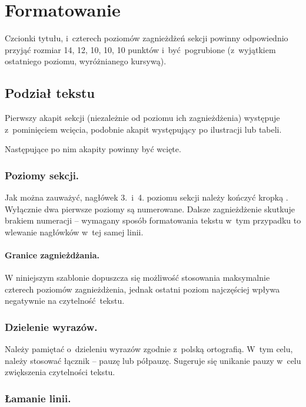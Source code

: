 \section{Formatowanie}
\label{sec:formatting}

Czcionki tytułu, i~czterech poziomów zagnieżdżeń sekcji powinny odpowiednio przyjąć rozmiar 14, 12, 10, 10, 10 punktów i~być pogrubione (z~wyjątkiem ostatniego poziomu, wyróżnianego kursywą).

\subsection{Podział tekstu}
\label{subsec:textDivision}

Pierwszy akapit sekcji (niezależnie od poziomu ich zagnieżdżenia) występuje z~pominięciem wcięcia, podobnie akapit występujący po ilustracji lub tabeli.

Następujące po nim akapity powinny być wcięte.

\subsubsection{Poziomy sekcji.}
\label{subsubsec:levels}

Jak można zauważyć, nagłówek 3.~i~4. poziomu sekcji należy kończyć kropką \cite{ref:lncs}. Wyłącznie dwa pierwsze poziomy są numerowane. Dalsze zagnieżdżenie skutkuje brakiem numeracji -- wymagany sposób formatowania tekstu w~tym przypadku to wlewanie nagłówków w~tej samej linii.

\paragraph{Granice zagnieżdżania.}
\label{par:nestingLimits}

W niniejszym szablonie dopuszcza się możliwość stosowania maksymalnie czterech poziomów zagnieżdżenia, jednak ostatni poziom najczęściej wpływa negatywnie na czytelność tekstu.

\subsubsection{Dzielenie wyrazów.}
\label{subsubsec:wordbreak}

Należy pamiętać o~dzieleniu wyrazów zgodnie z~polską ortografią. W~tym celu, należy stosować łącznik -- pauzę lub półpauzę. Sugeruje się unikanie pauzy w~celu zwiększenia czytelności tekstu.

\subsubsection{Łamanie linii.}
\label{subsubsec:linebreak}

